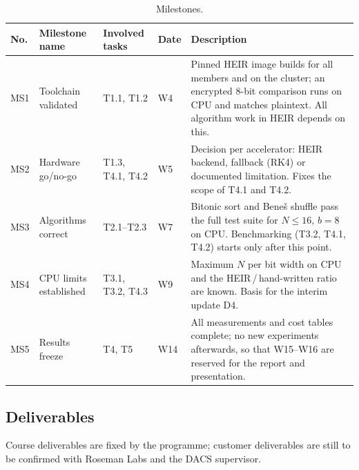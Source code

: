 \begin{table}[H]
\centering
\small
\caption{Milestones.}
\label{tab:milestones}
\begin{tabularx}{\textwidth}{l >{\raggedright\arraybackslash}p{} >{\raggedright\arraybackslash}p{} l >{\raggedright\arraybackslash}X}
\toprule
\textbf{No.} & \textbf{Milestone name} & \textbf{Involved tasks} & \textbf{Date} & \textbf{Description}\\
\midrule
MS1 & Toolchain validated & T1.1, T1.2 & W4 & Pinned HEIR image builds for all members and on the cluster; an encrypted 8-bit comparison runs on CPU and matches plaintext. All algorithm work in HEIR depends on this.\\
\midrule
MS2 & Hardware go/no-go & T1.3, T4.1, T4.2 & W5 & Decision per accelerator: HEIR backend, fallback (RK4) or documented limitation. Fixes the scope of T4.1 and T4.2.\\
\midrule
MS3 & Algorithms correct & T2.1--T2.3 & W7 & Bitonic sort and Bene\v{s} shuffle pass the full test suite for $N \leq 16$, $b=8$ on CPU. Benchmarking (T3.2, T4.1, T4.2) starts only after this point.\\
\midrule
MS4 & CPU limits established & T3.1, T3.2, T4.3 & W9 & Maximum $N$ per bit width on CPU and the HEIR\,/\,hand-written ratio are known. Basis for the interim update D4.\\
\midrule
MS5 & Results freeze & T4, T5 & W14 & All measurements and cost tables complete; no new experiments afterwards, so that W15--W16 are reserved for the report and presentation.\\
\bottomrule
\end{tabularx}
\end{table}

\subsection{Deliverables}\label{sec:deliverables} %

Course deliverables are fixed by the programme; customer deliverables are still to be confirmed with Roseman Labs and the DACS supervisor.

